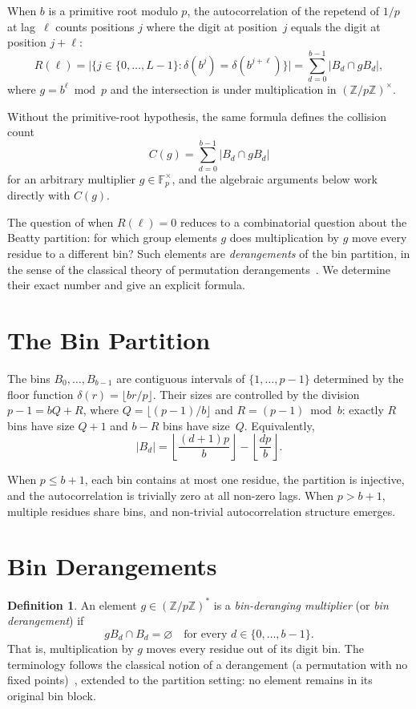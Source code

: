 \documentclass[12pt]{amsart}
\theoremstyle{definition}
\newtheorem{definition}[theorem]{Definition}
\theoremstyle{remark}
\begin{document}
When $b$ is a primitive root modulo $p$, the autocorrelation of
the repetend of $1/p$ at lag~$\ell$ counts positions $j$ where
the digit at position~$j$ equals the digit at position
$j + \ell$:
\[
R(\ell) = \bigl|\{j \in \{0, \ldots, L{-}1\} :
\delta(b^j) = \delta(b^{j+\ell})\}\bigr|
= \sum_{d=0}^{b-1} |B_d \cap g B_d|,
\]
where $g = b^{\ell} \bmod p$ and the intersection is under
multiplication in $(\mathbb{Z}/p\mathbb{Z})^{\times}$.

Without the primitive-root hypothesis, the same formula defines
the collision count
\[
C(g) = \sum_{d=0}^{b-1} |B_d \cap g B_d|
\]
for an arbitrary multiplier $g \in \mathbb{F}_p^\times$, and
the algebraic arguments below work directly with $C(g)$.

The question of when $R(\ell) = 0$ reduces to a combinatorial
question about the Beatty partition: for which group elements
$g$ does multiplication by $g$ move every residue to a
different bin? Such elements are \emph{derangements} of the
bin partition, in the sense of the classical theory of
permutation derangements~\cite{stanley}. We determine their
exact number and give an explicit formula.

\section{The Bin Partition}

The bins $B_0, \ldots, B_{b-1}$ are contiguous intervals of
$\{1, \ldots, p{-}1\}$ determined by the floor function
$\delta(r) = \lfloor br/p \rfloor$. Their sizes are controlled
by the division $p - 1 = bQ + R$, where
$Q = \lfloor (p{-}1)/b \rfloor$ and $R = (p{-}1) \bmod b$:
exactly $R$ bins have size $Q + 1$ and $b - R$ bins have
size~$Q$. Equivalently,
\[
|B_d|
= \left\lfloor \frac{(d+1)p}{b}\right\rfloor
 - \left\lfloor \frac{dp}{b}\right\rfloor .
\]

When $p \le b + 1$, each bin contains at most one residue,
the partition is injective, and the autocorrelation is trivially
zero at all non-zero lags. When $p > b + 1$, multiple residues
share bins, and non-trivial autocorrelation structure emerges.

\section{Bin Derangements}

\begin{definition}
An element $g \in (\mathbb{Z}/p\mathbb{Z})^{*}$ is a
\emph{bin-deranging multiplier} (or \emph{bin derangement}) if
\[
g B_d \cap B_d = \varnothing \quad \text{for every } d \in
\{0, \ldots, b{-}1\}.
\]
That is, multiplication by $g$ moves every residue out of its
digit bin. The terminology follows the classical notion of a
derangement (a permutation with no fixed points)~\cite{stanley},
extended to the partition setting: no element remains in its
original bin block.
\end{definition}
\end{document}
